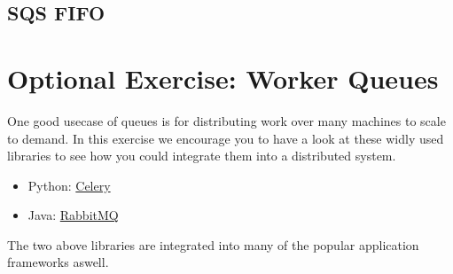 \documentclass{csse4400}
\begin{document}
\subsection{SQS FIFO}


\section{Optional Exercise: Worker Queues}

One good usecase of queues is for distributing work over many machines to scale to demand. In this exercise we encourage you to have a look at these widly used libraries to see how you could integrate them into a distributed system.

\begin{itemize}
  \item Python: \href{https://docs.celeryq.dev/en/stable/}{Celery}
  \item Java: \href{https://www.rabbitmq.com/tutorials/tutorial-one-java.html}{RabbitMQ}
\end{itemize}

The two above libraries are integrated into many of the popular application frameworks aswell.



\end{document}
